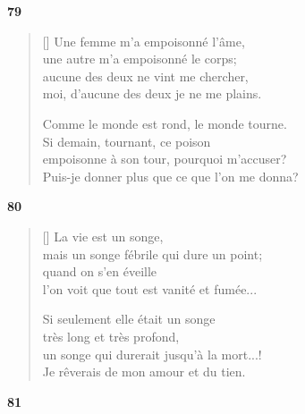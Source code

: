 \documentclass[a4paper,12pt]{book}
\begin{document}
\bigskip

\begin{center}
  \textbf{79}
\end{center}

\settowidth{\versewidth}{Puis-je donner plus que ce que l'on me donna?}

\begin{verse}[\versewidth]
  Une femme m'a empoisonné l'âme, \\
  une autre m'a empoisonné le corps; \\
  aucune des deux ne vint me chercher, \\
  moi, d'aucune des deux je ne me plains.

  Comme le monde est rond, le monde tourne. \\
  Si demain, tournant, ce poison \\
  empoisonne à son tour, pourquoi m'accuser? \\
  Puis-je donner plus que ce que l'on me donna?
\end{verse}

\bigskip

\begin{center}
  \textbf{80}
\end{center}

\settowidth{\versewidth}{un songe qui durerait jusqu'à la mort...!}

\begin{verse}[\versewidth]
  La vie est un songe, \\
  mais un songe fébrile qui dure un point; \\
  quand on s'en éveille \\
  l'on voit que tout est vanité et fumée...

  Si seulement elle était un songe \\
  très long et très profond, \\
  un songe qui durerait jusqu'à la mort...! \\
  Je rêverais de mon amour et du tien.
\end{verse}

\bigskip

\begin{center}
  \textbf{81}
\end{center}
\end{document}
